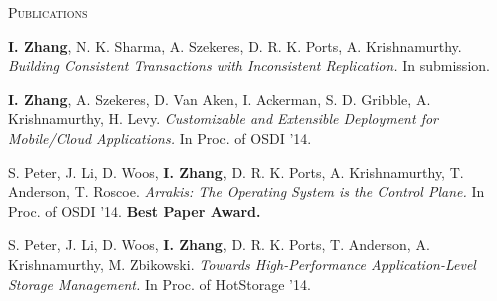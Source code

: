 \documentclass[10pt,times]{report}
\newlength{\sectiongap}
\newlength{\entrygap}
\newlength{\sectioncolwidth}
\newlength{\colgap}
\newlength{\stuffwidth}
\def\ifEqString#1#2{\def\testa{#1}\def\testb{#2}%
  \ifx\testa\testb}
\newenvironment{rtable}{
  \begin{minipage}{\textwidth}
  }{
  \end{minipage}
}
\newenvironment{rentry}[3][xxx]{
  \begin{minipage}[t]{\hsize}
    \textbf{#2}\ifEqString{#1}{xxx}\relax\else, \textit{#1}\fi
    \hspace{\stretch{1}} #3 \\
  }{
    \removelastskip
  \end{minipage}
  \\[\entrygap]  %
}
\newenvironment{rsection}[1]{
  \begin{minipage}[t]{\sectioncolwidth}
    \textsc{#1}
  \end{minipage}
  \hspace{\colgap}
  \begin{minipage}[t]{\stuffwidth}
  }{
    \removelastskip
  \end{minipage}
  \\[\sectiongap]
}
\begin{document}
\begin{rtable}
\vspace{1.0em}
 \begin{rsection}{Publications}
   \textbf{I. Zhang}, N. K. Sharma, A. Szekeres, D. R. K. Ports,
   A. Krishnamurthy. \textit{Building Consistent Transactions with
     Inconsistent Replication.}
   In submission.\\\vspace{-0.5em}


   \textbf{I. Zhang}, A. Szekeres, D. Van Aken, I. Ackerman, S. D. Gribble,
   A. Krishnamurthy, H. Levy. \textit{Customizable and Extensible
     Deployment for Mobile/Cloud Applications.} In Proc. of OSDI '14.\\\vspace{-0.5em}

   S. Peter, J. Li, D. Woos, \textbf{I. Zhang}, D. R. K. Ports,
   A. Krishnamurthy, T. Anderson, T. Roscoe. \textit{Arrakis: The
     Operating System is the Control Plane.} In Proc. of OSDI
   '14. \textbf{Best Paper Award.}\\\vspace{-0.5em}

   S. Peter, J. Li, D. Woos, \textbf{I. Zhang}, D. R. K. Ports, T. Anderson,
   A. Krishnamurthy, M. Zbikowski. \textit{Towards High-Performance
     Application-Level Storage Management.} In Proc. of HotStorage
   '14. \\\vspace{-0.5em}


\end{rsection}
\end{rtable}
\end{document}
